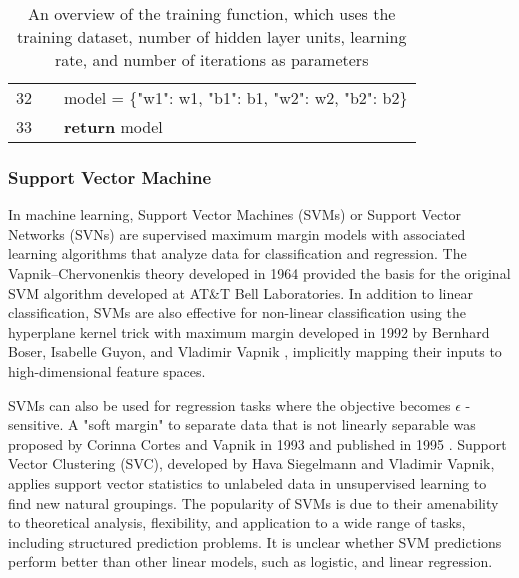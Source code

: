 \documentclass[preprint,12pt]{elsarticle}
\begin{document}
\begin{table}[ht]
{\begin{tabular}{|r l l l l|}
            \rowcolor{regularback} \cellcolor{linenumberback} \textcolor{grayhighlight}{32} & & \multicolumn{3}{l|}{model \textcolor{grayhighlight}{=} \{\textcolor{codered}{"w1"}: w1, \textcolor{codered}{"b1"}: b1, \textcolor{codered}{"w2"}: w2, \textcolor{codered}{"b2"}: b2\}} \\
            \rowcolor{regularback} \cellcolor{linenumberback} \textcolor{grayhighlight}{33} & & \multicolumn{3}{l|}{\textcolor{codegreen}{\textbf{return}} model} \\
            \hline
        \end{tabular}
    }
    \caption{An overview of the training function, which uses the training dataset, number of hidden layer units, learning rate, and number of iterations as parameters}
    \label{tab:train}
\end{table}

\subsubsection{Support Vector Machine}

In machine learning, Support Vector Machines (SVMs) or Support Vector Networks (SVNs) are supervised maximum margin models with associated learning algorithms that analyze data for classification and regression. The Vapnik–Chervonenkis theory developed in 1964 provided the basis for the original SVM algorithm developed at AT\&T Bell Laboratories. In addition to linear classification, SVMs are also effective for non-linear classification using the hyperplane kernel trick with maximum margin developed in 1992 by Bernhard Boser, Isabelle Guyon, and Vladimir Vapnik \cite{Boser1992}, implicitly mapping their inputs to high-dimensional feature spaces. 

SVMs can also be used for regression tasks where the objective becomes $\epsilon$ -sensitive. A "soft margin" to separate data that is not linearly separable was proposed by Corinna Cortes and Vapnik in 1993 and published in 1995 \cite{Cortes1995}. Support Vector Clustering \cite{BenHur2001} (SVC), developed by Hava Siegelmann and Vladimir Vapnik, applies support vector statistics to unlabeled data in unsupervised learning to find new natural groupings. The popularity of SVMs is due to their amenability to theoretical analysis, flexibility, and application to a wide range of tasks, including structured prediction problems. It is unclear whether SVM predictions perform better than other linear models, such as logistic, and linear regression.
\end{document}
